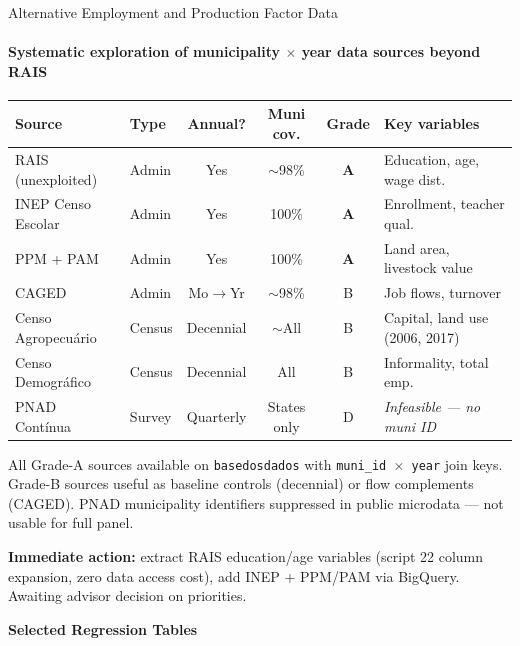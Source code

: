 \documentclass[aspectratio=169,10pt]{beamer}
\newcommand{\fpass}[1]{\cellcolor{pass}\textbf{#1}}
\begin{document}
\begin{frame}[t]{Alternative Employment and Production Factor Data}
\framesubtitle{Systematic exploration of municipality $\times$ year data sources beyond RAIS}
\begin{center}
\footnotesize
\setlength{\tabcolsep}{3pt}
\renewcommand{\arraystretch}{1.0}
\begin{tabular}{@{}llcccl@{}}
\toprule
Source & Type & Annual? & Muni cov. & Grade & Key variables \\
\midrule
RAIS (unexploited) & Admin & Yes & $\sim$98\% & \fpass{A} & Education, age, wage dist. \\
INEP Censo Escolar & Admin & Yes & 100\% & \fpass{A} & Enrollment, teacher qual. \\
PPM + PAM          & Admin & Yes & 100\% & \fpass{A} & Land area, livestock value \\
CAGED              & Admin & Mo$\to$Yr & $\sim$98\% & B & Job flows, turnover \\
Censo Agropecuário & Census & Decennial & $\sim$All & B & Capital, land use (2006, 2017) \\
Censo Demográfico  & Census & Decennial & All & B & Informality, total emp. \\
PNAD Contínua      & Survey & Quarterly & States only & D & \textit{Infeasible --- no muni ID} \\
\bottomrule
\end{tabular}
\end{center}
{\scriptsize All Grade-A sources available on \texttt{basedosdados} with \texttt{muni\_id $\times$ year} join keys.
Grade-B sources useful as baseline controls (decennial) or flow complements (CAGED).
PNAD municipality identifiers suppressed in public microdata --- not usable for full panel.}

\vspace{0.3em}
\textcolor{alertred}{\footnotesize\textbf{Immediate action:} extract RAIS education/age variables (script 22 column expansion, zero data access cost), add INEP + PPM/PAM via BigQuery.  Awaiting advisor decision on priorities.}
\end{frame}


\begin{frame}[plain]
\begin{center}
{\Large\textbf{Selected Regression Tables}}
\end{center}
\end{frame}
\end{document}

